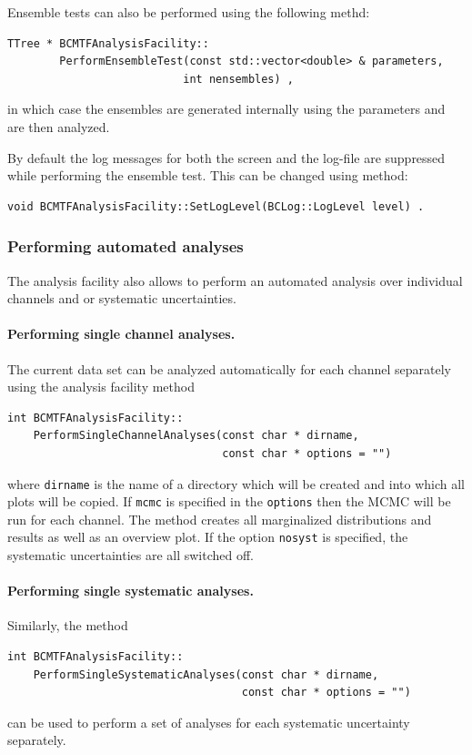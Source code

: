 \documentclass[11pt, a4paper]{article}
\begin{document}
Ensemble tests can also be performed using the following methd:
%
\begin{verbatim}
TTree * BCMTFAnalysisFacility::
        PerformEnsembleTest(const std::vector<double> & parameters,
                           int nensembles) ,
\end{verbatim}
%
in which case the ensembles are generated internally using the
parameters and are then analyzed.

By default the log messages for both the screen and the log-file
are suppressed while performing the ensemble test. This can be
changed using method:
%
\begin{verbatim}
void BCMTFAnalysisFacility::SetLogLevel(BCLog::LogLevel level) .
\end{verbatim}


\subsubsection{Performing automated analyses}

The analysis facility also allows to perform an automated analysis
over individual channels and or systematic uncertainties.

\paragraph{Performing single channel analyses.}

The current data set can be analyzed automatically for each channel
separately using the analysis facility method
%
\begin{verbatim}
int BCMTFAnalysisFacility::
    PerformSingleChannelAnalyses(const char * dirname,
                                 const char * options = "")
\end{verbatim}
%
where \verb|dirname| is the name of a directory which will be created
and into which all plots will be copied. If \verb|mcmc| is specified
in the \verb|options| then the MCMC will be run for each channel. The
method creates all marginalized distributions and results as well as
an overview plot. If the option \verb|nosyst| is specified, the
systematic uncertainties are all switched off.

\paragraph{Performing single systematic analyses.}

Similarly, the method
%
\begin{verbatim}
int BCMTFAnalysisFacility::
    PerformSingleSystematicAnalyses(const char * dirname,
                                    const char * options = "")
\end{verbatim}
%
can be used to perform a set of analyses for each systematic
uncertainty separately.
\end{document}
